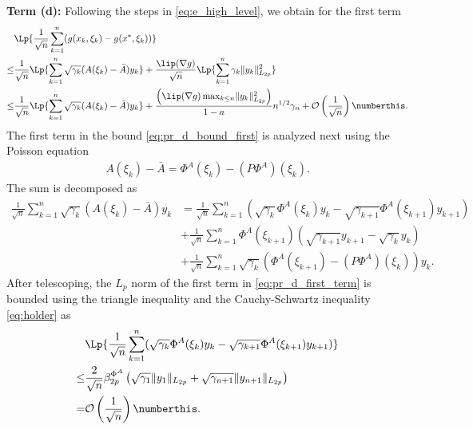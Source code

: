\documentclass[11pt]{article}
\begin{document}
\textbf{Term (d):}
Following the steps in \eqref{eq:e_high_level}, we obtain for the first term
\begin{align*}
    &\Lp{\frac{1}{\sqrt{n}} \sum_{k=1}^n (g(x_k, \xi_k) - g(x^*, \xi_k))}
    \\ 
    \leq &
    \frac{1}{\sqrt{n}} \Lp{\sum_{k=1}^n \sqrt{\gamma_k} (A(\xi_k) - \bar{A}) y_k}
    +
    \frac{\lip(\nabla g)}{\sqrt{n}} \Lp{\sum_{k=1}^n \gamma_k \lVert y_k \rVert_{L_{2p}}^2
    }
    \\ 
    \leq &
    \frac{1}{\sqrt{n}} \Lp{\sum_{k=1}^n \sqrt{\gamma_k} (A(\xi_k) - \bar{A}) y_k}
    +
    \frac{\left(\lip(\nabla g) \max_{k \leq n} \lVert y_k \rVert^2_{L_{2p}} \right)}{1-a} n^{1/2} \gamma_n
    + \mathcal{O}\left(\frac{1}{\sqrt{n}} \right) 
    \numberthis \label{eq:pr_d_bound_first}
    .
\end{align*}
The first term in the bound \eqref{eq:pr_d_bound_first} is analyzed next using the Poisson equation
\begin{align*}
    A(\xi_k) - \bar{A} = \Phi^A (\xi_k) - (P \Phi^A) (\xi_k) . 
\end{align*}
The sum is decomposed as
\begin{equation}\label{eq:pr_d_first_term}
\begin{split}
    \frac{1}{\sqrt{n}} \sum_{k=1}^n \sqrt{\gamma_k} (A(\xi_k) - \bar{A}) y_k
    &=
    \frac{1}{\sqrt{n}}\sum_{k=1}^n (\sqrt{\gamma_k} \Phi^A (\xi_k) y_k - \sqrt{\gamma_{k+1}} \Phi^A (\xi_{k+1}) y_{k+1})
    \\ &+
    \frac{1}{\sqrt{n}} \sum_{k=1}^n \Phi^A (\xi_{k+1}) (\sqrt{\gamma_{k+1}} y_{k+1} - \sqrt{\gamma_k} y_k)
    \\ &
    + \frac{1}{\sqrt{n}} \sum_{k=1}^n \sqrt{\gamma_k} (\Phi^A(\xi_{k+1}) - (P\Phi^A)(\xi_{k})) y_k .     
\end{split}    
\end{equation}
After telescoping, the $L_p$ norm of the first term in \eqref{eq:pr_d_first_term} is bounded using the triangle inequality and the Cauchy-Schwartz inequality \eqref{eq:holder} as 
\begin{align*}
    &\Lp{\frac{1}{\sqrt{n}}\sum_{k=1}^n (\sqrt{\gamma_k} \Phi^A (\xi_k) y_k - \sqrt{\gamma_{k+1}} \Phi^A (\xi_{k+1}) y_{k+1})}
    \\ 
    \leq&
    \frac{2}{\sqrt{n}} \beta_{2p}^{\Phi^A} \left(\sqrt{\gamma_1} \lVert y_1 \rVert_{L_{2p}} + \sqrt{\gamma_{n+1}} \lVert y_{n+1} \rVert_{L_{2p}} \right)
    \\ 
    =& \mathcal{O}\left(\frac{1}{\sqrt{n}} \right) 
    \numberthis \label{eq:pr_d_identity_first_bound}
    . 
\end{align*}
\end{document}
